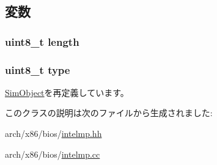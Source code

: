 \subsection{変数}
\hypertarget{classX86ISA_1_1IntelMP_1_1ExtConfigEntry_ab2b3adeb2a67e656ff030b56727fd0ac}{
\subsubsection[{length}]{\setlength{\rightskip}{0pt plus 5cm}uint8\_\-t {\bf length}}}
\label{classX86ISA_1_1IntelMP_1_1ExtConfigEntry_ab2b3adeb2a67e656ff030b56727fd0ac}
\hypertarget{classX86ISA_1_1IntelMP_1_1ExtConfigEntry_a1d127017fb298b889f4ba24752d08b8e}{
\subsubsection[{type}]{\setlength{\rightskip}{0pt plus 5cm}uint8\_\-t {\bf type}}}
\label{classX86ISA_1_1IntelMP_1_1ExtConfigEntry_a1d127017fb298b889f4ba24752d08b8e}


\hyperlink{classm5_1_1SimObject_1_1SimObject_acce15679d830831b0bbe8ebc2a60b2ca}{SimObject}を再定義しています。

このクラスの説明は次のファイルから生成されました:\begin{DoxyCompactItemize}
\item 
arch/x86/bios/\hyperlink{intelmp_8hh}{intelmp.hh}\item 
arch/x86/bios/\hyperlink{intelmp_8cc}{intelmp.cc}\end{DoxyCompactItemize}
